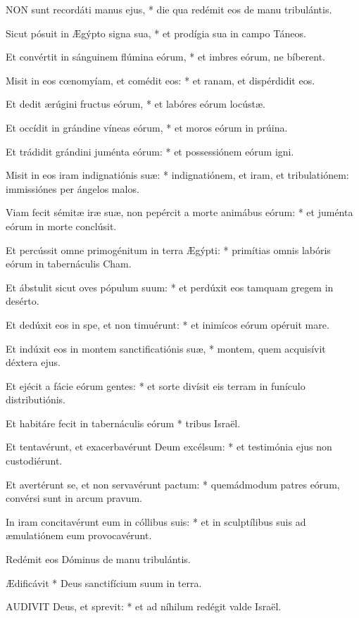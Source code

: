 \lettrine[lines=2]{N}{ON} sunt recordáti manus ejus, * die qua redémit eos de manu tribulántis.

Sicut pósuit in Ægýpto signa sua, * et prodígia sua in campo Táneos.

Et convértit in sánguinem flúmina eórum, * et imbres eórum, ne bíberent.

Misit in eos cœnomyíam, et comédit eos: * et ranam, et dispérdidit eos.

Et dedit ærúgini fructus eórum, * et labóres eórum locústæ.

Et occídit in grándine víneas eórum, * et moros eórum in prúina.

Et trádidit grándini juménta eórum: * et possessiónem eórum igni.

Misit in eos iram indignatiónis suæ: * indignatiónem, et iram, et tribulatiónem: immissiónes per ángelos malos.

Viam fecit sémitæ iræ suæ, non pepércit a morte animábus eórum: * et juménta eórum in morte conclúsit.

Et percússit omne primogénitum in terra Ægýpti: * primítias omnis labóris eórum in tabernáculis Cham.

Et ábstulit sicut oves pópulum suum: * et perdúxit eos tamquam gregem in desérto.

Et dedúxit eos in spe, et non timuérunt: * et inimícos eórum opéruit mare.

Et indúxit eos in montem sanctificatiónis suæ, * montem, quem acquisívit déxtera ejus.

Et ejécit a fácie eórum gentes: * et sorte divísit eis terram in funículo distributiónis.

Et habitáre fecit in tabernáculis eórum * tribus Israël.

Et tentavérunt, et exacerbavérunt Deum excélsum: * et testimónia ejus non custodiérunt.

Et avertérunt se, et non servavérunt pactum: * quemádmodum patres eórum, convérsi sunt in arcum pravum.

In iram concitavérunt eum in cóllibus suis: * et in sculptílibus suis ad æmulatiónem eum provocavérunt.

 Redémit eos Dóminus de manu tribulántis.

 Ædificávit * Deus sanctifícium suum in terra.


\lettrine[lines=2]{A}{UDIVIT} Deus, et sprevit: * et ad níhilum redégit valde Israël.

